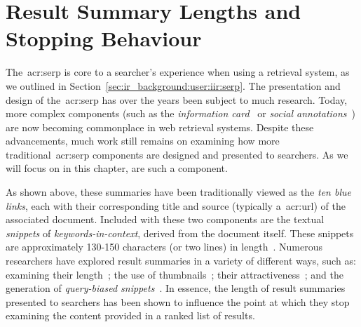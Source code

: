 
\chapter[Result Summary Lengths and Stopping Behaviour]{Result Summary Lengths and\\Stopping Behaviour}\label{chap:snippets}
The~\gls{acr:serp} is core to a searcher's experience when using a retrieval system, as we outlined in Section~\ref{sec:ir_background:user:iir:serp}. The presentation and design of the~\gls{acr:serp} has over the years been subject to much research. Today, more complex components (such as the \emph{information card}~\citep{navalpakkam2013non_linear_serp} or \emph{social annotations}~\citep{muralidharan2012social_annotations}) are now becoming commonplace in web retrieval systems. Despite these advancements, much work still remains on examining how more traditional~\gls{acr:serp} components are designed and presented to searchers. As we will focus on in this chapter, \emph{} are such a component.

\begin{figure}[h]
    \centering
    \vspace{4mm}
    \label{fig:serpintro}
    \vspace{-5mm}
\end{figure}

As shown above, these summaries have been traditionally viewed as the \emph{ten blue links}, each with their corresponding title and source (typically a~\gls{acr:url}) of the associated document. Included with these two components are the textual \emph{snippets} of \emph{keywords-in-context}, derived from the document itself. These snippets are approximately 130-150 characters (or two lines) in length~\citep{hearst2009_search}. Numerous researchers have explored result summaries in a variety of different ways, such as: examining their length~\citep{paek2004wavelens,cutrell2007eye_tracking,kaisser2008improving}; the use of thumbnails~\citep{woodruff2002summaries,teevan2009visual_snippets}; their attractiveness~\citep{clarke2007caption_features,he2012bridging}; and the generation of \emph{query-biased snippets}~\citep{tombros1998query_biased,rose2007snippet_attributes}. In essence, the length of result summaries presented to searchers has been shown to influence the point at which they stop examining the content provided in a ranked list of results. 

